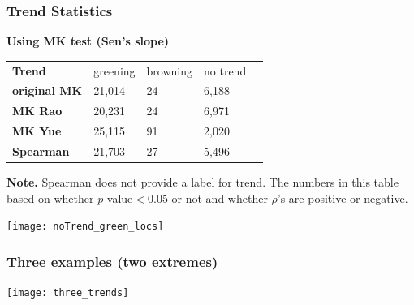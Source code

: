 \documentclass[serif, xcolor={dvipsnames}]{beamer} %
\begin{document}
\begin{frame}
\frametitle{Trend Statistics}

{\bf Using MK test (Sen's slope)}

\begin{table}[!ht]
\centering
\captionsetup{singlelinecheck=false, format=hang}
\label{tab:Trendcounts}
\begin{tabular}{lllll}
\bottomrule
\rowcolor{shadecolor} \textbf{Trend} & 
 greening & browning & no trend \\ 
\textbf{original MK}  & 21,014 & 24 & 6,188 \\
\rowcolor{shadecolor} \textbf{MK Rao}  & 20,231 & 24 & 6,971 \\
\textbf{MK Yue}  &  25,115 & 91 & 2,020 \\
\rowcolor{aliceblue}\textbf{Spearman}  & 21,703 & 27 & 5,496\\
\toprule
\end{tabular}
\end{table}
\begin{tcolorbox}
{\scriptsize{\bf Note.} Spearman does not provide a label for trend. The numbers
in this table based on whether $p$-value$<$0.05 or not and whether $\rho$'s are positive or negative.}
\end{tcolorbox}
\end{frame}
\begin{frame}
\begin{center}
\texttt{[image: noTrend\_green\_locs]}
\end{center}
\end{frame}
\begin{frame}
 \frametitle{Three examples (two extremes)}
\begin{center}
\texttt{[image: three\_trends]}
\end{center}
\end{frame}
\end{document}
